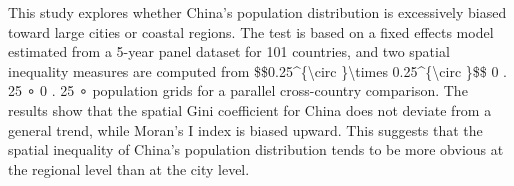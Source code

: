 This study explores whether China's population distribution is excessively biased toward large cities or coastal regions. The test is based on a fixed effects model estimated from a 5-year panel dataset for 101 countries, and two spatial inequality measures are computed from                                                                           {\$}{\$}0.25^{\{}{\backslash}circ {\}}{\backslash}times 0.25^{\{}{\backslash}circ {\}}{\$}{\$}                                                                                    0                        .                                                  25                          ∘                                                {\texttimes}                        0                        .                                                  25                          ∘                                                                                                     population grids for a parallel cross-country comparison. The results show that the spatial Gini coefficient for China does not deviate from a general trend, while Moran's I index is biased upward. This suggests that the spatial inequality of China's population distribution tends to be more obvious at the regional level than at the city level.